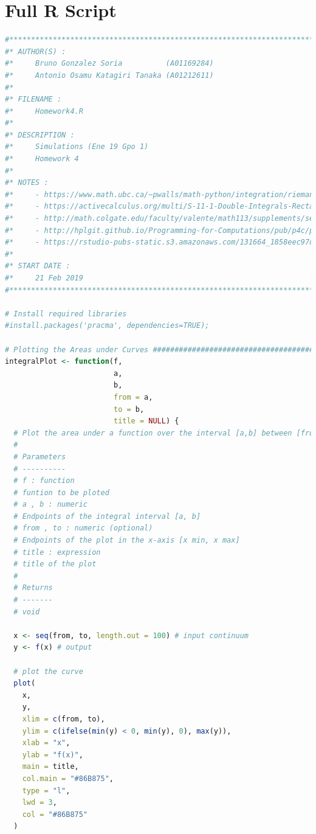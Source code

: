 \documentclass[11pt,a4paper]{article}
\begin{document}
\clearpage

\section{Full R Script}\label{sec:fullScript}

\begin{lstlisting}[frame=trBL, language=R]
#**********************************************************************
#* AUTHOR(S) :
#*     Bruno Gonzalez Soria          (A01169284)
#*     Antonio Osamu Katagiri Tanaka (A01212611)
#*
#* FILENAME :
#*     Homework4.R
#*
#* DESCRIPTION :
#*     Simulations (Ene 19 Gpo 1)
#*     Homework 4
#*
#* NOTES :
#*     - https://www.math.ubc.ca/~pwalls/math-python/integration/riemann-sums/
#*     - https://activecalculus.org/multi/S-11-1-Double-Integrals-Rectangles.html
#*     - http://math.colgate.edu/faculty/valente/math113/supplements/section151handout.pdf
#*     - http://hplgit.github.io/Programming-for-Computations/pub/p4c/p4c-sphinx-Python/._pylight004.html
#*     - https://rstudio-pubs-static.s3.amazonaws.com/131664_1858eec97df54c9b8d5edcd8b22e5818.html
#*
#* START DATE :
#*     21 Feb 2019
#**********************************************************************

# Install required libraries
#install.packages('pracma', dependencies=TRUE);

# Plotting the Areas under Curves #####################################
integralPlot <- function(f,
                         a,
                         b,
                         from = a,
                         to = b,
                         title = NULL) {
  # Plot the area under a function over the interval [a,b] between [from,to].
  #
  # Parameters
  # ----------
  # f : function
  # funtion to be ploted
  # a , b : numeric
  # Endpoints of the integral interval [a, b]
  # from , to : numeric (optional)
  # Endpoints of the plot in the x-axis [x min, x max]
  # title : expression
  # title of the plot
  #
  # Returns
  # -------
  # void
  
  x <- seq(from, to, length.out = 100) # input continuum
  y <- f(x) # output
  
  # plot the curve
  plot(
    x,
    y,
    xlim = c(from, to),
    ylim = c(ifelse(min(y) < 0, min(y), 0), max(y)),
    xlab = "x",
    ylab = "f(x)",
    main = title,
    col.main = "#86B875",
    type = "l",
    lwd = 3,
    col = "#86B875"
  )
  

\end{lstlisting}
\end{document}

